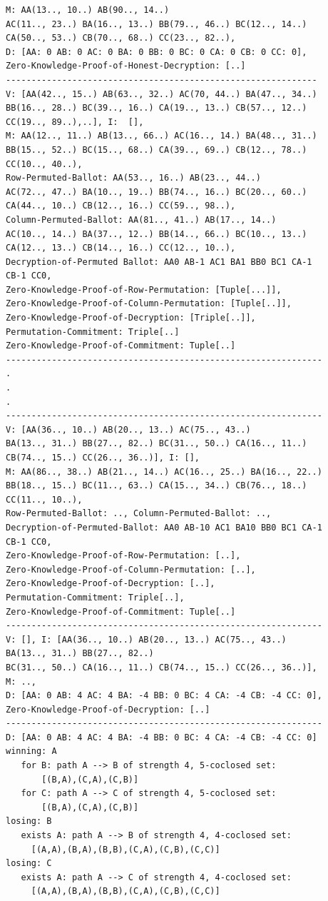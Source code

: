 \documentclass{llncs}
\begin{document}
\begin{lstlisting}[frame=single,basicstyle=\ttfamily\footnotesize]
M: AA(13.., 10..) AB(90.., 14..) 
AC(11.., 23..) BA(16.., 13..) BB(79.., 46..) BC(12.., 14..)
CA(50.., 53..) CB(70.., 68..) CC(23.., 82..), 
D: [AA: 0 AB: 0 AC: 0 BA: 0 BB: 0 BC: 0 CA: 0 CB: 0 CC: 0], 
Zero-Knowledge-Proof-of-Honest-Decryption: [..]
-------------------------------------------------------------
V: [AA(42.., 15..) AB(63.., 32..) AC(70, 44..) BA(47.., 34..) 
BB(16.., 28..) BC(39.., 16..) CA(19.., 13..) CB(57.., 12..) 
CC(19.., 89..),..], I:  [], 
M: AA(12.., 11..) AB(13.., 66..) AC(16.., 14.) BA(48.., 31..) 
BB(15.., 52..) BC(15.., 68..) CA(39.., 69..) CB(12.., 78..)
CC(10.., 40..),
Row-Permuted-Ballot: AA(53.., 16..) AB(23.., 44..) 
AC(72.., 47..) BA(10.., 19..) BB(74.., 16..) BC(20.., 60..) 
CA(44.., 10..) CB(12.., 16..) CC(59.., 98..),
Column-Permuted-Ballot: AA(81.., 41..) AB(17.., 14..) 
AC(10.., 14..) BA(37.., 12..) BB(14.., 66..) BC(10.., 13..)
CA(12.., 13..) CB(14.., 16..) CC(12.., 10..),
Decryption-of-Permuted Ballot: AA0 AB-1 AC1 BA1 BB0 BC1 CA-1 
CB-1 CC0,
Zero-Knowledge-Proof-of-Row-Permutation: [Tuple[...]], 
Zero-Knowledge-Proof-of-Column-Permutation: [Tuple[..]], 
Zero-Knowledge-Proof-of-Decryption: [Triple[..]], 
Permutation-Commitment: Triple[..]
Zero-Knowledge-Proof-of-Commitment: Tuple[..]
--------------------------------------------------------------
.
.
.
--------------------------------------------------------------
V: [AA(36.., 10..) AB(20.., 13..) AC(75.., 43..) 
BA(13.., 31..) BB(27.., 82..) BC(31.., 50..) CA(16.., 11..) 
CB(74.., 15..) CC(26.., 36..)], I: [],
M: AA(86.., 38..) AB(21.., 14..) AC(16.., 25..) BA(16.., 22..) 
BB(18.., 15..) BC(11.., 63..) CA(15.., 34..) CB(76.., 18..) 
CC(11.., 10..), 
Row-Permuted-Ballot: .., Column-Permuted-Ballot: .., 
Decryption-of-Permuted-Ballot: AA0 AB-10 AC1 BA10 BB0 BC1 CA-1 
CB-1 CC0,
Zero-Knowledge-Proof-of-Row-Permutation: [..],
Zero-Knowledge-Proof-of-Column-Permutation: [..], 
Zero-Knowledge-Proof-of-Decryption: [..], 
Permutation-Commitment: Triple[..], 
Zero-Knowledge-Proof-of-Commitment: Tuple[..]
--------------------------------------------------------------
V: [], I: [AA(36.., 10..) AB(20.., 13..) AC(75.., 43..) 
BA(13.., 31..) BB(27.., 82..)
BC(31.., 50..) CA(16.., 11..) CB(74.., 15..) CC(26.., 36..)], 
M: .., 
D: [AA: 0 AB: 4 AC: 4 BA: -4 BB: 0 BC: 4 CA: -4 CB: -4 CC: 0],
Zero-Knowledge-Proof-of-Decryption: [..]
--------------------------------------------------------------
D: [AA: 0 AB: 4 AC: 4 BA: -4 BB: 0 BC: 4 CA: -4 CB: -4 CC: 0]
winning: A
   for B: path A --> B of strength 4, 5-coclosed set: 
       [(B,A),(C,A),(C,B)]
   for C: path A --> C of strength 4, 5-coclosed set:
       [(B,A),(C,A),(C,B)] 
losing: B
   exists A: path A --> B of strength 4, 4-coclosed set: 
     [(A,A),(B,A),(B,B),(C,A),(C,B),(C,C)]
losing: C
   exists A: path A --> C of strength 4, 4-coclosed set: 
     [(A,A),(B,A),(B,B),(C,A),(C,B),(C,C)]

\end{lstlisting}
\end{document}
